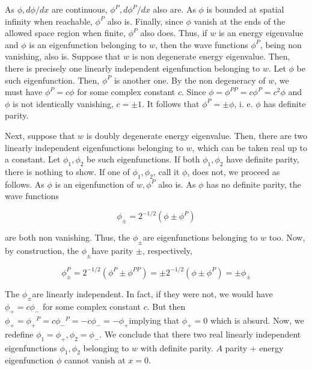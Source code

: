 \documentclass{article}
\begin{document}
As $\phi, d \phi / d x$ are continuous, $\phi^{P}, d \phi^{P} / d x$ also are. As $\phi$ is bounded at spatial infinity when reachable, $\phi^{P}$ also is. Finally, since $\phi$ vanish at the ends of the allowed space region when finite, $\phi^{P}$ also does. Thus, if $w$ is an energy eigenvalue and $\phi$ is an
eigenfunction belonging to $w$, then the wave functions $\phi^{P}$, being non vanishing, also is.
Suppose that $w$ is non degenerate energy eigenvalue. Then, there is precisely one linearly independent eigenfunction belonging to $w$. Let $\phi$ be such eigenfunction. Then, $\phi^{P}$ is another one. By the non degeneracy of $w$, we must have $\phi^{P}=c \phi$ for some complex constant $c$. Since $\phi=\phi^{P P}=c \phi^{P}=c^{2} \phi$ and $\phi$ is not identically vanishing, $c= \pm 1$. It follows that $\phi^{P}= \pm \phi$, i. e. $\phi$ has definite parity.

Next, suppose that $w$ is doubly degenerate energy eigenvalue. Then, there are two linearly independent eigenfunctions belonging to $w$, which can be taken real up to a constant. Let $\phi_{1}, \phi_{2}$ be such eigenfunctions. If both $\phi_{1}, \phi_{2}$ have definite parity, there is nothing to show. If one of $\phi_{1}, \phi_{2}$, call it $\phi$, does not, we proceed as follows. As $\phi$ is an eigenfunction of $w, \phi^{P}$ also is. As $\phi$ has no definite parity, the wave functions
 
\begin{equation*}
\phi_{ \pm}=2^{-1 / 2}\left(\phi \pm \phi^{P}\right) \tag{4.2.7}
\end{equation*}
 
are both non vanishing. Thus, the $\phi_{ \pm}$are eigenfunctions belonging to $w$ too. Now, by construction, the $\phi_{ \pm}$have parity $\pm$, respectively,
 
\begin{equation*}
\phi_{ \pm}^{P}=2^{-1 / 2}\left(\phi^{P} \pm \phi^{P P}\right)= \pm 2^{-1 / 2}\left(\phi \pm \phi^{P}\right)= \pm \phi_{ \pm} \tag{4.2.8}
\end{equation*}
 

The $\phi_{ \pm}$are linearly independent. In fact, if they were not, we would have $\phi_{+}=c \phi_{-}$ for some complex constant $c$. But then $\phi_{+}=\phi_{+}{ }^{P}=c \phi_{-}{ }^{P}=-c \phi_{-}=-\phi_{+}$implying that $\phi_{+}=0$ which is absurd. Now, we redefine $\phi_{1}=\phi_{+}, \phi_{2}=\phi_{-}$. We conclude that there two real linearly independent eigenfunctions $\phi_{1}, \phi_{2}$ belonging to $w$ with definite parity.
$A$ parity + energy eigenfunction $\phi$ cannot vanish at $x=0$.
\end{document}
